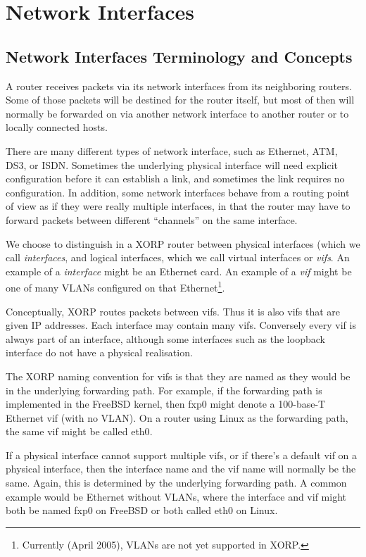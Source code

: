%
%

\chapter{Network Interfaces}
\label{interfaces}
\section{Network Interfaces Terminology and Concepts}

A router receives packets via its network interfaces from its
neighboring routers.  Some of those packets will be destined for the
router itself, but most of then will normally be forwarded on via
another network interface to another router or to locally connected
hosts.

There are many different types of network interface, such as Ethernet,
ATM, DS3, or ISDN.  Sometimes the underlying physical interface will
need explicit configuration before it can establish a link, and
sometimes the link requires no configuration.  In addition, some
network interfaces behave from a routing point of view as if they were
really multiple interfaces, in that the router may have to forward
packets between different ``channels'' on the same interface.  

We choose to distinguish in a XORP router between physical interfaces
(which we call {\it interfaces}, and logical interfaces, which we call
virtual interfaces or {\it vifs}.  An example of a {\it interface}
might be an Ethernet card.  An example of a {\it vif} might be one of
many VLANs configured on that Ethernet\footnote{Currently (April 2005),
VLANs are not yet supported in XORP.}.

Conceptually, XORP routes packets between vifs.  Thus it is also vifs
that are given IP addresses.  Each interface may contain many vifs.
Conversely every vif is always part of an interface, although some
interfaces such as the loopback interface do not have a physical
realisation.

The XORP naming convention for vifs is that they are named as they
would be in the underlying forwarding path.  For example, if the
forwarding path is implemented in the FreeBSD kernel, then {\stt fxp0}
might denote a 100-base-T Ethernet vif (with no VLAN).  On a router
using Linux as the forwarding path, the same vif might be called {\stt
eth0}.  

If a physical interface cannot support multiple vifs, or if there's a
default vif on a physical interface, then the interface name and the
vif name will normally be the same.  Again, this is determined by the
underlying forwarding path.  A common example would be Ethernet
without VLANs, where the interface and vif might both be named {\stt
fxp0} on FreeBSD or both called {\stt eth0} on Linux.

